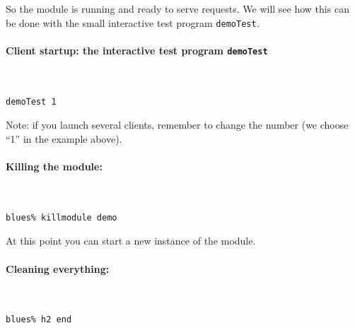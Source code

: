 So the module is running and ready to serve requests. We will see how
this can be done with the small interactive test program {\tt demoTest}.

\paragraph{Client startup: the interactive test program {\tt demoTest}}

\begin{description} %
\item ~
\begin{center}\begin{cartouche}\small\begin{verbatim}
demoTest 1
\end{verbatim}\end{cartouche}\end{center}
\end{description}

Note: if  you launch several clients, remember  to  change the number (we
choose ``1'' in the example above).

\paragraph{Killing the module:}

\begin{description} %
\item ~
\begin{center}\begin{cartouche}\small\begin{verbatim}
blues% killmodule demo
\end{verbatim}\end{cartouche}\end{center}
\end{description}

At this point you can start a new instance of the module.

\paragraph{Cleaning everything:}

\begin{description} %
\item ~
\begin{center}\begin{cartouche}\small\begin{verbatim}
blues% h2 end
\end{verbatim}\end{cartouche}\end{center}
\end{description}

